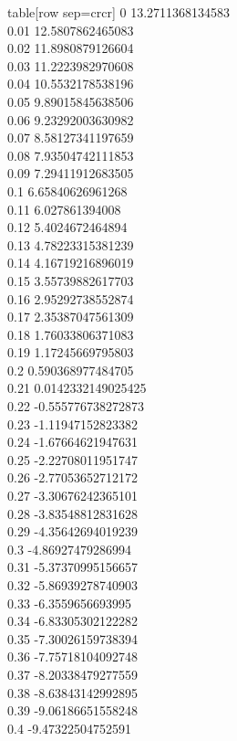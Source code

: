   table[row sep=crcr]{%
0	13.2711368134583\\
0.01	12.5807862465083\\
0.02	11.8980879126604\\
0.03	11.2223982970608\\
0.04	10.5532178538196\\
0.05	9.89015845638506\\
0.06	9.23292003630982\\
0.07	8.58127341197659\\
0.08	7.93504742111853\\
0.09	7.29411912683505\\
0.1	6.65840626961268\\
0.11	6.027861394008\\
0.12	5.4024672464894\\
0.13	4.78223315381239\\
0.14	4.16719216896019\\
0.15	3.55739882617703\\
0.16	2.95292738552874\\
0.17	2.35387047561309\\
0.18	1.76033806371083\\
0.19	1.17245669795803\\
0.2	0.590368977484705\\
0.21	0.0142332149025425\\
0.22	-0.555776738272873\\
0.23	-1.11947152823382\\
0.24	-1.67664621947631\\
0.25	-2.22708011951747\\
0.26	-2.77053652712172\\
0.27	-3.30676242365101\\
0.28	-3.83548812831628\\
0.29	-4.35642694019239\\
0.3	-4.86927479286994\\
0.31	-5.37370995156657\\
0.32	-5.86939278740903\\
0.33	-6.3559656693995\\
0.34	-6.83305302122282\\
0.35	-7.30026159738394\\
0.36	-7.75718104092748\\
0.37	-8.20338479277559\\
0.38	-8.63843142992895\\
0.39	-9.06186651558248\\
0.4	-9.47322504752591\\
}
